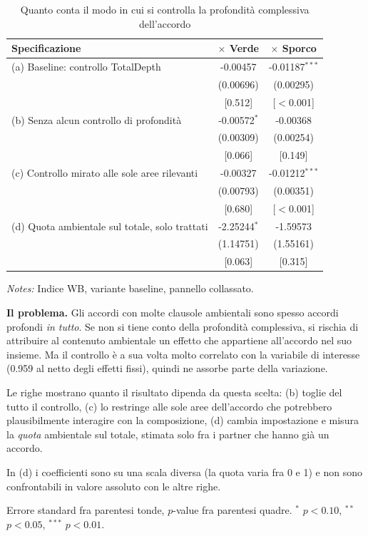 \begin{table}[htbp]
\centering
\footnotesize
\caption{Quanto conta il modo in cui si controlla la profondit\`a complessiva dell'accordo}
\label{tab:depthctrl}
\begin{threeparttable}
\begin{tabular}{lcc}
\toprule
Specificazione & $\times$ Verde & $\times$ Sporco \\
\midrule
(a) Baseline: controllo TotalDepth & -0.00457 & -0.01187$^{***}$ \\
 & (0.00696) & (0.00295) \\
 & [0.512] & [$<$0.001] \\
\addlinespace
(b) Senza alcun controllo di profondit\`a & -0.00572$^{*}$ & -0.00368 \\
 & (0.00309) & (0.00254) \\
 & [0.066] & [0.149] \\
\addlinespace
(c) Controllo mirato alle sole aree rilevanti & -0.00327 & -0.01212$^{***}$ \\
 & (0.00793) & (0.00351) \\
 & [0.680] & [$<$0.001] \\
\addlinespace
(d) Quota ambientale sul totale, solo trattati & -2.25244$^{*}$ & -1.59573 \\
 & (1.14751) & (1.55161) \\
 & [0.063] & [0.315] \\
\bottomrule
\end{tabular}
\begin{tablenotes}[flushleft]\footnotesize
\item \emph{Notes:} Indice WB, variante baseline, pannello collassato.
\item \textbf{Il problema.} Gli accordi con molte clausole ambientali sono spesso accordi profondi \emph{in tutto}. Se non si tiene conto della profondit\`a complessiva, si rischia di attribuire al contenuto ambientale un effetto che appartiene all'accordo nel suo insieme. Ma il controllo \`e a sua volta molto correlato con la variabile di interesse (0.959 al netto degli effetti fissi), quindi ne assorbe parte della variazione.
\item Le righe mostrano quanto il risultato dipenda da questa scelta: (b) toglie del tutto il controllo, (c) lo restringe alle sole aree dell'accordo che potrebbero plausibilmente interagire con la composizione, (d) cambia impostazione e misura la \emph{quota} ambientale sul totale, stimata solo fra i partner che hanno gi\`a un accordo.
\item In (d) i coefficienti sono su una scala diversa (la quota varia fra 0 e 1) e non sono confrontabili in valore assoluto con le altre righe.
\item Errore standard fra parentesi tonde, $p$-value fra parentesi quadre. $^{*}$ $p<0.10$, $^{**}$ $p<0.05$, $^{***}$ $p<0.01$.
\end{tablenotes}
\end{threeparttable}
\end{table}
